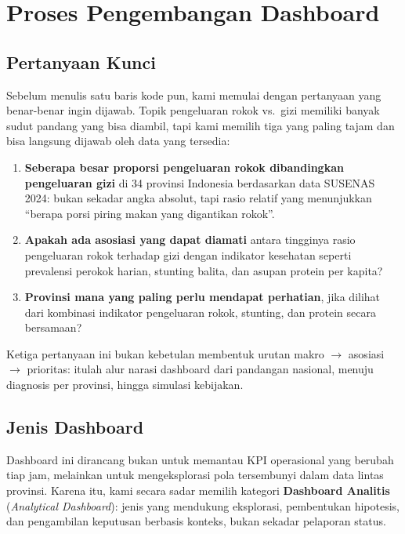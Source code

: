 \chapter{Proses Pengembangan Dashboard}

\section{Pertanyaan Kunci}

Sebelum menulis satu baris kode pun, kami memulai dengan pertanyaan yang benar-benar ingin dijawab. Topik pengeluaran rokok vs.\ gizi memiliki banyak sudut pandang yang bisa diambil, tapi kami memilih tiga yang paling tajam dan bisa langsung dijawab oleh data yang tersedia:

\begin{enumerate}
  \item \textbf{Seberapa besar proporsi pengeluaran rokok dibandingkan pengeluaran gizi} di 34 provinsi Indonesia berdasarkan data SUSENAS 2024: bukan sekadar angka absolut, tapi rasio relatif yang menunjukkan ``berapa porsi piring makan yang digantikan rokok''.
  \item \textbf{Apakah ada asosiasi yang dapat diamati} antara tingginya rasio pengeluaran rokok terhadap gizi dengan indikator kesehatan seperti prevalensi perokok harian, stunting balita, dan asupan protein per kapita?
  \item \textbf{Provinsi mana yang paling perlu mendapat perhatian}, jika dilihat dari kombinasi indikator pengeluaran rokok, stunting, dan protein secara bersamaan?
\end{enumerate}

Ketiga pertanyaan ini bukan kebetulan membentuk urutan makro $\to$ asosiasi $\to$ prioritas: itulah alur narasi dashboard dari pandangan nasional, menuju diagnosis per provinsi, hingga simulasi kebijakan.

\section{Jenis Dashboard}

Dashboard ini dirancang bukan untuk memantau KPI operasional yang berubah tiap jam, melainkan untuk mengeksplorasi pola tersembunyi dalam data lintas provinsi. Karena itu, kami secara sadar memilih kategori \textbf{Dashboard Analitis} (\textit{Analytical Dashboard}): jenis yang mendukung eksplorasi, pembentukan hipotesis, dan pengambilan keputusan berbasis konteks, bukan sekadar pelaporan status.

